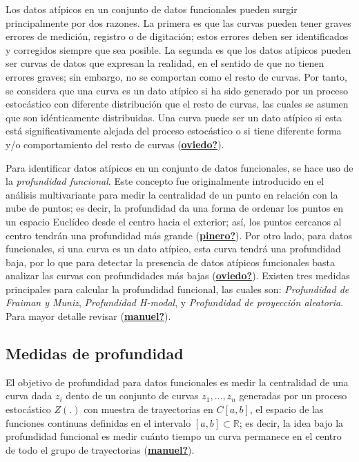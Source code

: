 \documentclass[
]{book}
\begin{document}
Los datos atípicos en un conjunto de datos funcionales pueden surgir principalmente por dos razones. La primera es que las curvas pueden tener graves errores de medición, registro o de digitación; estos errores deben ser identificados y corregidos siempre que sea posible. La segunda es que los datos atípicos pueden ser curvas de datos que expresan la realidad, en el sentido de que no tienen errores graves; sin embargo, no se comportan como el resto de curvas. Por tanto, se considera que una curva es un dato atípico si ha sido generado por un proceso estocástico con diferente distribución que el resto de curvas, las cuales se asumen que son idénticamente distribuidas. Una curva puede ser un dato atípico si esta está significativamente alejada del proceso estocástico o si tiene diferente forma y/o comportamiento del resto de curvas (\protect\hyperlink{ref-oviedo}{\textbf{oviedo?}}).

Para identificar datos atípicos en un conjunto de datos funcionales, se hace uso de la \emph{profundidad funcional}. Este concepto fue originalmente introducido en el análisis multivariante para medir la centralidad de un punto en relación con la nube de puntos; es decir, la profundidad da una forma de ordenar los puntos en un espacio Euclídeo desde el centro hacia el exterior; así, los puntos cercanos al centro tendrán una profundidad más grande (\protect\hyperlink{ref-pinero}{\textbf{pinero?}}). Por otro lado, para datos funcionales, si una curva es un dato atípico, esta curva tendrá una profundidad baja, por lo que para detectar la presencia de datos atípicos funcionales basta analizar las curvas con profundidades más bajas (\protect\hyperlink{ref-oviedo}{\textbf{oviedo?}}). Existen tres medidas principales para calcular la profundidad funcional, las cuales son: \emph{Profundidad de Fraiman y Muniz}, \emph{Profundidad H-modal}, y \emph{Profundidad de proyección aleatoria}. Para mayor detalle revisar (\protect\hyperlink{ref-manuel}{\textbf{manuel?}}).

\hypertarget{medidas-de-profundidad}{%
\subsection{Medidas de profundidad}\label{medidas-de-profundidad}}

El objetivo de profundidad para datos funcionales es medir la centralidad de una curva dada \(z_i\) dento de un conjunto de curvas \(z_1,...,z_n\) generadas por un proceso estocástico \(Z(.)\) con muestra de trayectorias en \(C[a,b]\), el espacio de las funciones continuas definidas en el intervalo \([a,b]\subset \mathbb{R}\); es decir, la idea bajo la profundidad funcional es medir cuánto tiempo un curva permanece en el centro de todo el grupo de trayectorias (\protect\hyperlink{ref-manuel}{\textbf{manuel?}}).
\end{document}
